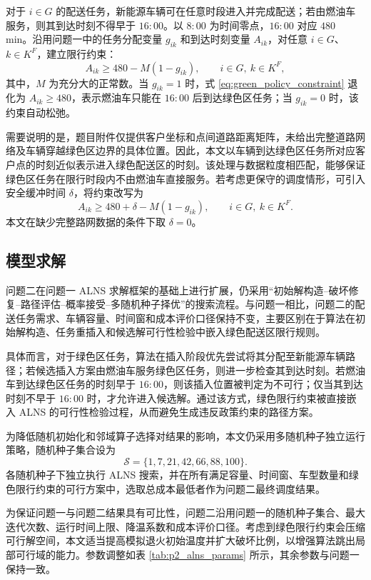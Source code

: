 \documentclass[withoutpreface,bwprint]{cumcmthesis} %
\begin{document}
对于 $i\in G$ 的配送任务，新能源车辆可在任意时段进入并完成配送；若由燃油车服务，则其到达时刻不得早于 $16{:}00$。以 $8{:}00$ 为时间零点，$16{:}00$ 对应 $480$ min。沿用问题一中的任务分配变量 $g_{ik}$ 和到达时刻变量 $A_{ik}$，对任意 $i\in G$、$k\in K^F$，建立限行约束：
\begin{equation}
A_{ik}\geq 480-M(1-g_{ik}),\qquad i\in G,\ k\in K^F,
\label{eq:green_policy_constraint}
\end{equation}
其中，$M$ 为充分大的正常数。当 $g_{ik}=1$ 时，式 \eqref{eq:green_policy_constraint} 退化为 $A_{ik}\geq 480$，表示燃油车只能在 $16{:}00$ 后到达绿色区任务；当 $g_{ik}=0$ 时，该约束自动松弛。

需要说明的是，题目附件仅提供客户坐标和点间道路距离矩阵，未给出完整道路网络及车辆穿越绿色区边界的具体位置。因此，本文以车辆到达绿色区任务所对应客户点的时刻近似表示进入绿色配送区的时刻。该处理与数据粒度相匹配，能够保证绿色区任务在限行时段内不由燃油车直接服务。若考虑更保守的调度情形，可引入安全缓冲时间 $\delta$，将约束改写为
\[
A_{ik}\ge 480+\delta-M(1-g_{ik}),\qquad i\in G,\ k\in K^F.
\]
本文在缺少完整路网数据的条件下取 $\delta=0$。

\subsection{模型求解}

问题二在问题一 ALNS 求解框架的基础上进行扩展，仍采用“初始解构造--破坏修复--路径评估--概率接受--多随机种子择优”的搜索流程\cite{shaw1998,ropke2006}。与问题一相比，问题二的配送任务需求、车辆容量、时间窗和成本评价口径保持不变，主要区别在于算法在初始解构造、任务重插入和候选解可行性检验中嵌入绿色配送区限行规则。

具体而言，对于绿色区任务，算法在插入阶段优先尝试将其分配至新能源车辆路径；若候选插入方案由燃油车服务绿色区任务，则进一步检查其到达时刻。若燃油车到达绿色区任务的时刻早于 $16{:}00$，则该插入位置被判定为不可行；仅当其到达时刻不早于 $16{:}00$ 时，才允许进入候选解。通过该方式，绿色限行约束被直接嵌入 ALNS 的可行性检验过程，从而避免生成违反政策约束的路径方案。

为降低随机初始化和邻域算子选择对结果的影响，本文仍采用多随机种子独立运行策略，随机种子集合设为
\[
\mathcal{S}=\{1,7,21,42,66,88,100\}.
\]
各随机种子下独立执行 ALNS 搜索，并在所有满足容量、时间窗、车型数量和绿色限行约束的可行方案中，选取总成本最低者作为问题二最终调度结果。

为保证问题一与问题二结果具有可比性，问题二沿用问题一的随机种子集合、最大迭代次数、运行时间上限、降温系数和成本评价口径。考虑到绿色限行约束会压缩可行解空间，本文适当提高模拟退火初始温度并扩大破坏比例，以增强算法跳出局部可行域的能力。参数调整如表 \ref{tab:p2_alns_params} 所示，其余参数与问题一保持一致。
\end{document}
